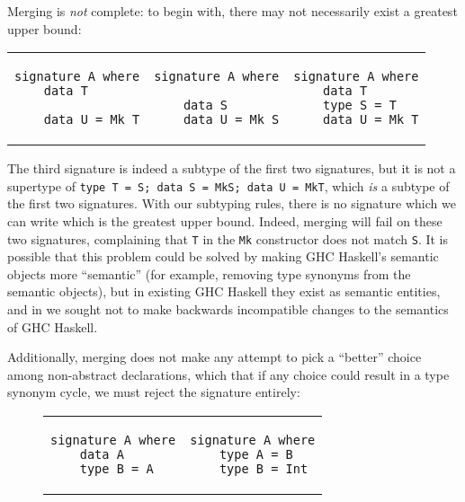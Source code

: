\noindent
Merging is \emph{not} complete:  to begin
with, there may not necessarily exist a greatest upper bound:

\begin{tabular}{p{} p{} p{}}
\begin{verbatim}
signature A where
    data T

    data U = Mk T
\end{verbatim}
&
\begin{verbatim}
signature A where

    data S
    data U = Mk S
\end{verbatim}
&
\begin{verbatim}
signature A where
    data T
    type S = T
    data U = Mk T
\end{verbatim}
\end{tabular}
%
The third signature is indeed a subtype of the first two signatures, but
it is not a supertype of \verb|type T = S; data S = MkS; data U = MkT|, which
\emph{is} a subtype of the first two signatures.  With our subtyping rules,
there is no signature which we can write which is the greatest upper bound.
Indeed, merging will fail on these two signatures, complaining that \verb|T|
in the \verb|Mk| constructor does not match \verb|S|.  It is possible that
this problem could be solved by making GHC Haskell's semantic objects
more ``semantic'' (for example, removing type synonyms from the semantic
objects), but in existing GHC Haskell they exist as semantic entities, and in
\Backpack{} we sought not to make backwards incompatible changes to the
semantics of GHC Haskell.

Additionally, merging does not make any attempt to pick a ``better'' choice
among non-abstract declarations, which that if any choice could result in a
type synonym cycle, we must reject the signature entirely:

\vspace{-1em}
\begin{figure}[H]
\centering
\begin{shortmath}
\begin{tabular}{p{} p{}}
\begin{lstlisting}
signature A where
    data A
    type B = A
\end{lstlisting}
&
\begin{lstlisting}
signature A where
    type A = B
    type B = Int
\end{lstlisting}
\end{tabular}
\end{shortmath}
\end{figure}

